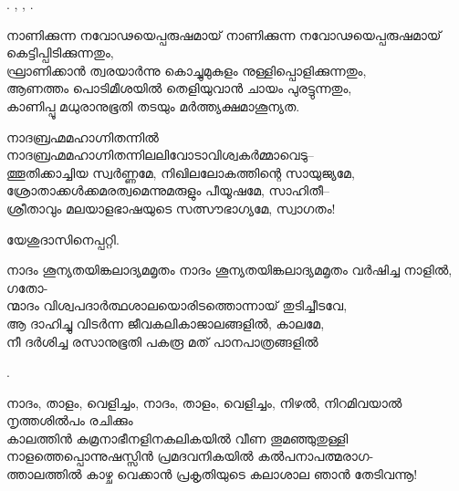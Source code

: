 \begin{enumerate}

. , 
, .

\begin{slokam}{\VSv}{\VKG}{നാണിക്കുന്ന നവോഢയെപ്പരുഷമായ്‌}
നാണിക്കുന്ന നവോഢയെപ്പരുഷമായ്‌ കെട്ടിപ്പിടിക്കുന്നതും,\\
ഘ്രാണിക്കാന്‍ ത്വരയാര്‍ന്നു കൊച്ചുമുകുളം നുള്ളിപ്പൊളിക്കുന്നതും,\\
ആണത്തം പൊടിമീശയില്‍ തെളിയുവാന്‍ ചായം പുരട്ടുന്നതും,\\
കാണിപ്പൂ മധുരാനുഭൂതി തടയും മര്‍ത്ത്യക്ഷമാശൂന്യത.
\end{slokam}


\begin{slokam}{\VSv}{\UN}{നാദബ്രഹ്മമഹാഗ്നിതന്നിൽ}
നാദബ്രഹ്മമഹാഗ്നിതന്നിലലിവോടാവിശ്വകർമ്മാവെടു--\\
ത്തൂതിക്കാച്ചിയ സ്വർണ്ണമേ, നിഖിലലോകത്തിന്റെ സായുജ്യമേ,\\
ശ്രോതാക്കള്‍ക്കമരത്വമെന്നുമരുളും പീയൂഷമേ, സാഹിതീ--\\
ശ്രീതാവും മലയാളഭാഷയുടെ സത്സൗഭാഗ്യമേ, സ്വാഗതം!
\end{slokam}


യേശുദാസിനെപ്പറ്റി.


\begin{slokam}{\VSv}{\VRV}{നാദം ശൂന്യതയിങ്കലാദ്യമമൃതം}
നാദം ശൂന്യതയിങ്കലാദ്യമമൃതം വര്‍ഷിച്ച നാളില്‍, ഗതോ-\\
ന്മാദം വിശ്വപദാര്‍ത്ഥശാലയൊരിടത്തൊന്നായ്‌ തുടിച്ചീടവേ,\\
ആ ദാഹിച്ചു വിടര്‍ന്ന ജീവകലികാജാലങ്ങളില്‍, കാലമേ,\\
നീ ദര്‍ശിച്ച രസാനുഭൂതി പകരൂ മത്‌ പാനപാത്രങ്ങളില്‍
\end{slokam}


.

\begin{slokam}{\VSr}{\VRV}{നാദം, താളം, വെളിച്ചം,}
നാദം, താളം, വെളിച്ചം, നിഴൽ, നിറമിവയാൽ നൃത്തശിൽപം രചിക്കും\\
കാലത്തിൻ കമ്രനാഭീനളിനകലികയിൽ വീണ തൂമഞ്ഞുതുള്ളി\\
നാളത്തെപ്പൊന്നുഷസ്സിൻ പ്രമദവനികയിൽ കൽപനാപത്മരാഗ-\\
ത്താലത്തിൽ കാഴ്ച വെക്കാൻ പ്രകൃതിയുടെ കലാശാല ഞാൻ തേടിവന്നൂ!
\end{slokam}


\end{enumerate}

